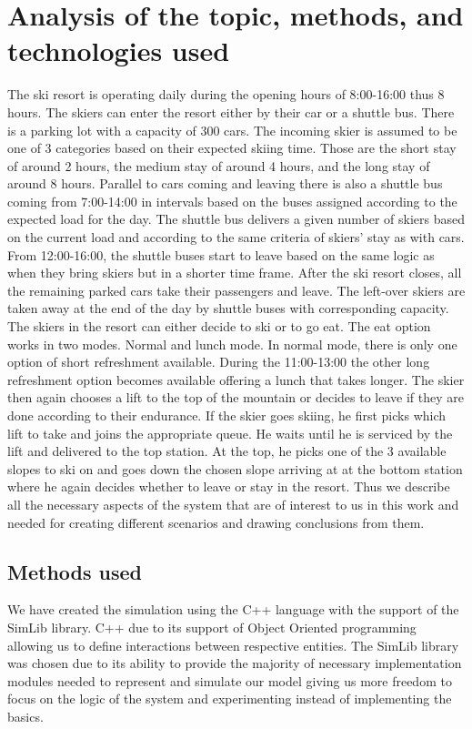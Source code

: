 \documentclass[11pt,a4paper]{article}
\begin{document}
\section{Analysis of the topic, methods, and technologies used}
The ski resort is operating daily during the opening hours of 8:00-16:00 thus 8 hours. The skiers can enter the resort either by their car or a shuttle bus. There is a parking lot with a capacity of 300 cars. The incoming skier is assumed to be one of 3 categories based on their expected skiing time. Those are the short stay of around 2 hours, the medium stay of around 4 hours, and the long stay of around 8 hours. Parallel to cars coming and leaving there is also a shuttle bus coming from 7:00-14:00 in intervals based on the buses assigned according to the expected load for the day. The shuttle bus delivers a given number of skiers based on the current load and according to the same criteria of skiers' stay as with cars. From 12:00-16:00, the shuttle buses start to leave based on the same logic as when they bring skiers but in a shorter time frame. After the ski resort closes, all the remaining parked cars take their passengers and leave. The left-over skiers are taken away at the end of the day by shuttle buses with corresponding capacity. \newline
The skiers in the resort can either decide to ski or to go eat. The eat option works in two modes. Normal and lunch mode. In normal mode, there is only one option of short refreshment available. During the 11:00-13:00 the other long refreshment option becomes available offering a lunch that takes longer. The skier then again chooses a lift to the top of the mountain or decides to leave if they are done according to their endurance. If the skier goes skiing, he first picks which lift to take and joins the appropriate queue. He waits until he is serviced by the lift and delivered to the top station. At the top, he picks one of the 3 available slopes to ski on and goes down the chosen slope arriving at at the bottom station where he again decides whether to leave or stay in the resort. \newline
Thus we describe all the necessary aspects of the system that are of interest to us in this work and needed for creating different scenarios and drawing conclusions from them.
\subsection{Methods used}
We have created the simulation using the C++ language with the support of the SimLib library. C++ due to its support of Object Oriented programming allowing us to define interactions between respective entities. The SimLib library was chosen due to its ability to provide the majority of necessary implementation modules needed to represent and simulate our model giving us more freedom to focus on the logic of the system and experimenting instead of implementing the basics.
\end{document}
